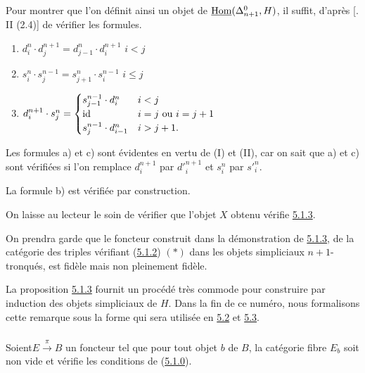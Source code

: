 \documentclass[10pt]{../fichiers-configuration-latex/smfart}
\begin{document}
\noindent \sisi{$+$}{} Pour montrer que l'on définit ainsi un objet de
$\underline{\operatorname{Hom}}(\Delta^0_{n+1}, H)$, il suffit, d'après [\cite{SGA4-05bis:3}. II (2.4)] de
vérifier les formules.
\begin{enumerate}
\renewcommand{\theenumi}{\alph{enumi}}
\renewcommand{\labelenumi}{\theenumi)}
\item $d^n_i \cdot d^{n+1}_j = d^n_{j-1} \cdot d^{n+1}_i$ \qquad $i <
  j$

\item $s^n_i \cdot s^{n-1}_j = s^n_{j+1} \cdot s^{n-1}_i$ \qquad $i
  \leq j$

\item $d^{n+1}_i \cdot s^n_j =
\begin{cases}
s^{n-1}_{j-1}\cdot d^n_i & i < j\\
\operatorname{id} & i = j \mbox{ ou } i = j+1\\
s^{n-1}_{j}\cdot d^n_{i-1} & i > j+1.
\end{cases}$
\end{enumerate}

Les formules a) et c) sont évidentes en vertu de (I) et (II), car on
sait que a) et c) sont vérifiées si l'on remplace $d^{n+1}_i$ par
${d'}^{n+1}_i$ et $s^n_i$ par ${s'}^n_i$.

La formule b) est vérifiée par construction.

On laisse au lecteur le soin de vérifier que l'objet $X$ obtenu
vérifie \hyperref[Vbis.prop5.1.3]{5.1.3}.

\noindent \sisi{$+$}{} On prendra garde que le foncteur construit dans la
démonstration de \hyperref[Vbis.prop5.1.3]{5.1.3}, de la catégorie des triples vérifiant
(\hyperref[Vbis.subsubsec5.1.2]{5.1.2}) $(\ast)$ dans les objets simpliciaux
$n+1$-tronqués, est fidèle mais non pleinement fidèle.

La proposition \hyperref[Vbis.prop5.1.3]{5.1.3} fournit un procédé très commode pour construire
par induction des objets simpliciaux de $H$. Dans la fin de ce numéro,
nous formalisons cette remarque sous la forme qui sera utilisée en \hyperref[Vbis.subsec5.2]{5.2}
et \hyperref[Vbis.subsec5.3]{5.3}.

\setcounter{subsubsection}{3}
\subsubsection{}

Soient\pageoriginale $E \xrightarrow{\pi} B$ un foncteur tel que
pour tout objet $b$ de $B$, la catégorie fibre $E_b$ soit non vide et
vérifie les conditions de (\hyperref[Vbis.subsubsec5.1.0]{5.1.0}).
\end{document}
